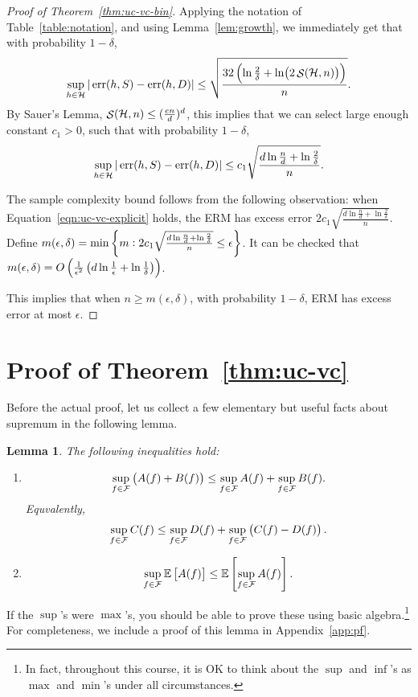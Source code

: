 \documentclass{article}
\newtheorem{lemma}{Lemma}
\DeclareMathOperator*{\err}{{\rm err}}
\DeclareMathOperator*{\Scal}{{\cal S}}
\newcommand{\EE}{\mathbb{E}}
\newcommand{\Hcal}{\mathcal{H}}
\newcommand{\Fcal}{\mathcal{F}}
\begin{document}
\begin{proof}[Proof of Theorem~\ref{thm:uc-vc-bin}]
Applying the notation of Table~\ref{table:notation}, and using Lemma~\ref{lem:growth},
we immediately get that with probability $1-\delta$,
\[ \sup_{h \in \Hcal} |\err(h,S) - \err(h,D)| \leq \sqrt{\frac{32\del{\ln\frac{2}{\delta} + \ln(2\Scal(\Hcal, n))}}{n}}. \]
By Sauer's Lemma, $\Scal(\Hcal, n) \leq (\frac{en}{d})^d$, this implies that we can select large enough constant $c_1 > 0$, such that with probability $1-\delta$,
\begin{equation}
  \sup_{h \in \Hcal} |\err(h,S) - \err(h,D)| \leq c_1 \sqrt{\frac{d\ln\frac{n}{d} + \ln\frac{2}{\delta}}{n}}.
  \label{eqn:uc-vc-explicit}
\end{equation}

The sample complexity bound follows from the following observation: when Equation~\eqref{eqn:uc-vc-explicit} holds, the ERM has excess error
$2c_1 \sqrt{\frac{d\ln\frac{n}{d} + \ln\frac{2}{\delta}}{n}}$. Define
$m(\epsilon,\delta) = \min\cbr{m: 2c_1 \sqrt{\frac{d\ln\frac{n}{d} + \ln\frac{2}{\delta}}{n}} \leq \epsilon}$. It can be checked that
$m(\epsilon,\delta) = O\del{\frac{1}{\epsilon^2}\del{d \ln \frac1\epsilon + \ln\frac1\delta}}$.

This implies that when $n \geq m(\epsilon,\delta)$, with probability $1-\delta$, ERM has excess error at most $\epsilon$.
\end{proof}


\section{Proof of Theorem~\ref{thm:uc-vc}}

Before the actual proof, let us collect a few elementary but useful facts about supremum in the following lemma.
\begin{lemma}
The following inequalities hold:
\begin{enumerate}
  \item
  \[ \sup_{f \in \Fcal} \del{A(f) + B(f)} \leq \sup_{f \in \Fcal} A(f) + \sup_{f \in \Fcal} B(f). \]
  Equvalently,
  \[ \sup_{f \in \Fcal} C(f) \leq \sup_{f \in \Fcal} D(f) + \sup_{f \in \Fcal} \del{C(f) - D(f)}. \]
  \label{item:sup-sub}
  \item \[ \sup_{f \in \Fcal} \EE \sbr{A(f)} \leq \EE \sbr{\sup_{f \in \Fcal} A(f)}. \]
  \label{item:sup-exp}
\end{enumerate}
\label{lem:sup}
\end{lemma}
If the $\sup$'s were $\max$'s, you should be able to prove these using basic algebra.\footnote{In fact, throughout this course, it is OK to think about the $\sup$ and $\inf$'s as $\max$ and $\min$'s under all circumstances.} For completeness, we include a proof of this lemma in Appendix~\ref{app:pf}.
\end{document}

